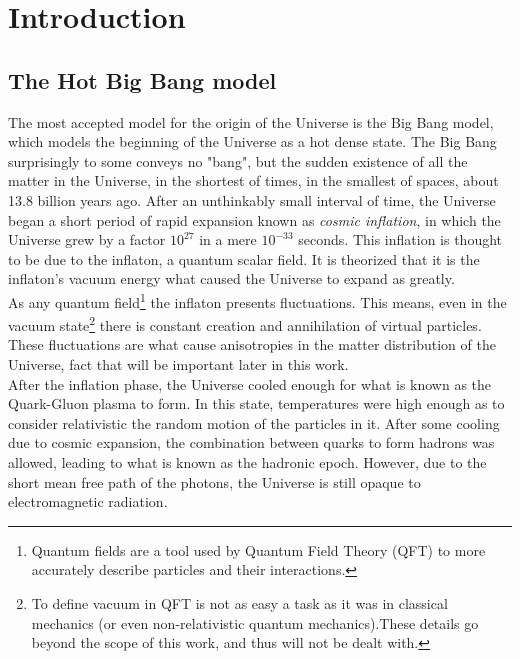 \chapter{Introduction}

\section{The Hot Big Bang model}

The most accepted model for the origin of the Universe is the Big Bang model, which models the beginning of the Universe as a hot dense state. The Big Bang surprisingly to some conveys no "bang", but the sudden existence of all the matter in the Universe, in the shortest of times, in the smallest of spaces, about 13.8 billion years ago. After an unthinkably small interval of time, the Universe began a short period of rapid expansion known as \textit{cosmic inflation}, in which the Universe grew by a factor $10^{27}$ in a mere $10^{-33}$ seconds. This inflation is thought to be due to the inflaton, a quantum scalar field. It is theorized that it is the inflaton's vacuum energy what caused the Universe to expand as greatly. \\

As any quantum field\footnote{Quantum fields are a tool used by Quantum Field Theory (QFT) to more accurately describe particles and their interactions.} the inflaton presents fluctuations. This means, even in the vacuum state\footnote{To define vacuum in QFT is not as easy a task as it was in classical mechanics (or even non-relativistic quantum mechanics).These details go beyond the scope of this work, and thus will not be dealt with.} there is constant creation and annihilation of virtual particles. These fluctuations are what cause anisotropies in the matter distribution of the Universe, fact that will be important later in this work. \\

After the inflation phase, the Universe cooled enough for what is known as the Quark-Gluon plasma to form. In this state, temperatures were high enough as to consider relativistic the random motion of the particles in it. After some cooling due to cosmic expansion, the combination between quarks to form hadrons was allowed, leading to what is known as the hadronic epoch. However, due to the short mean free path of the photons, the Universe is still opaque to electromagnetic radiation. \\

